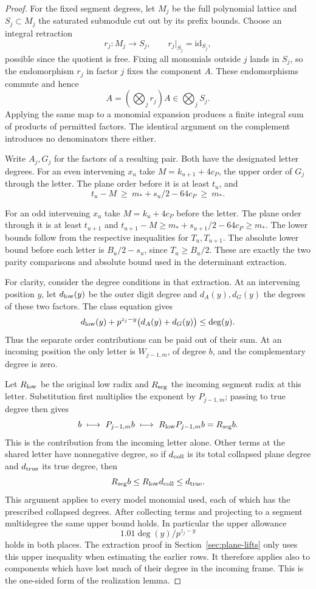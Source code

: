 \begin{proof}
For the fixed segment degrees, let \(M_j\) be the full
polynomial lattice and \(S_j\subset M_j\) the saturated
submodule cut out by its prefix bounds. Choose an integral
retraction
\[
 r_j:M_j\longrightarrow S_j,\qquad r_j|_{S_j}=\mathrm{id}_{S_j},
\]
possible since the quotient
is free. Fixing all monomials outside \(j\) lands in \(S_j\),
so the endomorphism \(r_j\) in factor \(j\) fixes the component
\(A\). These endomorphisms commute and hence
\[
                   A=(\bigotimes_j r_j)A
                           \in\bigotimes_j S_j.
\]
Applying the same map to a monomial expansion produces
a finite integral sum of products of permitted factors.
The identical argument on the complement introduces no
denominators there either.

Write \(A_j,G_j\) for the factors of a resulting pair. Both have
the designated letter degrees. For an even intervening \(x_u\) take \(M=k_{u+1}+4c_P\),
the upper order of \(G_j\) through the letter. The plane
order before it is at least \(t_u\), and
\[
 t_u-M\ \ge\ m_*+s_u/2-64c_P\ \ge\ m_* .
\]

For an odd intervening \(x_u\) take \(M=k_u+4c_P\)
before the letter. The plane order through it is at least
\(t_{u+1}\) and
\(t_{u+1}-M\ge m_*+s_{u+1}/2-64c_P\ge m_*\).
The lower bounds follow from the respective inequalities
for \(T_u,T_{u+1}\).
The absolute lower bound before each letter is
\(B_u/2-s_u\), since \(T_u\ge B_u/2\).
These are exactly the two parity comparisons and absolute
bound used in the determinant extraction.

For clarity, consider the degree conditions in that extraction.
At an intervening position \(y\), let \(d_{\rm low}(y)\) be the
outer digit degree and \(d_A(y),d_G(y)\) the degrees of these two
factors. The class equation gives
\[
  d_{\rm low}(y)+p^{z_j-y}\bigl(d_A(y)+d_G(y)\bigr)\le\deg(y).
\]
Thus the separate order contributions can be paid out of their sum. At an incoming position
the only letter is \(W_{j-1,m}\), of degree \(b\), and the
complementary degree is zero.

Let \(R_{\rm low}\) be the original low radix and \(R_{\rm seg}\) the incoming segment radix at this letter. Substitution first multiplies the exponent by \(P_{j-1,m}\); passing to true degree then gives
\[
 b\ \longmapsto\ P_{j-1,m}b
      \ \longmapsto\ R_{\rm low}P_{j-1,m}b=R_{\rm seg}b .
\]
This is the contribution from the incoming letter alone. Other terms at the shared letter have nonnegative degree, so if \(d_{\rm coll}\) is its total collapsed plane degree and \(d_{\rm true}\) its true degree, then
\[
 R_{\rm seg}b\le R_{\rm low}d_{\rm coll}\le d_{\rm true}.
\] This argument applies
to every model monomial used, each of which has the prescribed
collapsed degrees. After collecting terms and projecting to a
segment multidegree the same upper bound holds. In particular
the upper allowance
\[
 1.01\deg(y)/p^{z_j-y}
\]
holds in both
places. The extraction proof in Section~\ref{sec:plane-lifts}
only uses this upper inequality when estimating the earlier rows.
It therefore applies also to components which have lost much of
their degree in the incoming frame. This is the one-sided form
of the realization lemma.


\end{proof}
